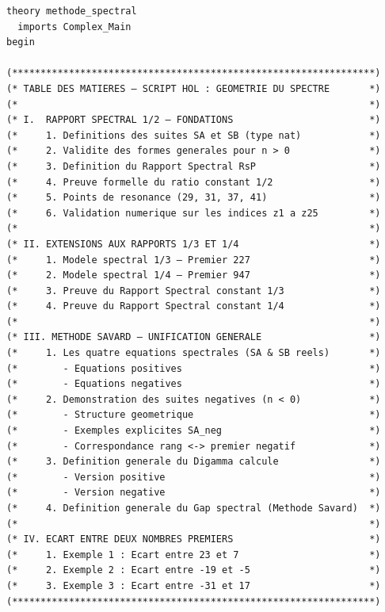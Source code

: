 \documentclass[a4paper,11pt]{article}
\begin{document}
\begin{holcode}[title={\textcolor{white}{File: methode\_spectral.thy -- Part 1/4}}]
\begin{lstlisting}
theory methode_spectral
  imports Complex_Main
begin

(****************************************************************)
(* TABLE DES MATIERES – SCRIPT HOL : GEOMETRIE DU SPECTRE       *)
(*                                                              *)
(* I.  RAPPORT SPECTRAL 1/2 – FONDATIONS                        *)
(*     1. Definitions des suites SA et SB (type nat)            *)
(*     2. Validite des formes generales pour n > 0              *)
(*     3. Definition du Rapport Spectral RsP                    *)
(*     4. Preuve formelle du ratio constant 1/2                 *)
(*     5. Points de resonance (29, 31, 37, 41)                  *)
(*     6. Validation numerique sur les indices z1 a z25         *)
(*                                                              *)
(* II. EXTENSIONS AUX RAPPORTS 1/3 ET 1/4                       *)
(*     1. Modele spectral 1/3 – Premier 227                     *)
(*     2. Modele spectral 1/4 – Premier 947                     *)
(*     3. Preuve du Rapport Spectral constant 1/3               *)
(*     4. Preuve du Rapport Spectral constant 1/4               *)
(*                                                              *)
(* III. METHODE SAVARD – UNIFICATION GENERALE                   *)
(*     1. Les quatre equations spectrales (SA & SB reels)       *)
(*        - Equations positives                                 *)
(*        - Equations negatives                                 *)
(*     2. Demonstration des suites negatives (n < 0)            *)
(*        - Structure geometrique                               *)
(*        - Exemples explicites SA_neg                          *)
(*        - Correspondance rang <-> premier negatif             *)
(*     3. Definition generale du Digamma calcule                *)
(*        - Version positive                                    *)
(*        - Version negative                                    *)
(*     4. Definition generale du Gap spectral (Methode Savard)  *)
(*                                                              *)
(* IV. ECART ENTRE DEUX NOMBRES PREMIERS                        *)
(*     1. Exemple 1 : Ecart entre 23 et 7                       *)
(*     2. Exemple 2 : Ecart entre -19 et -5                     *)
(*     3. Exemple 3 : Ecart entre -31 et 17                     *)
(****************************************************************)


\end{lstlisting}
\end{holcode}
\end{document}

